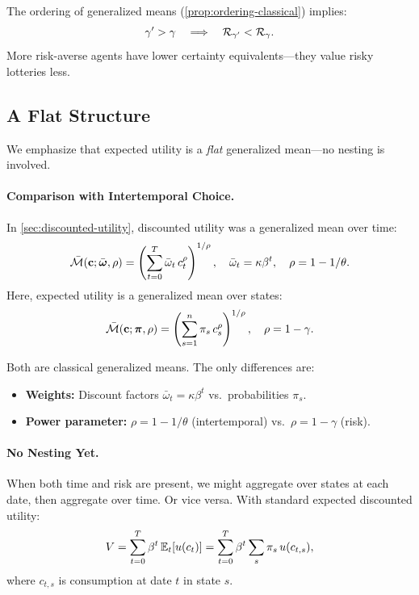The ordering of generalized means (\cref{prop:ordering-classical}) implies:
\begin{equation}
\gamma' > \gamma \quad \Longrightarrow \quad \mathcal{R}_{\gamma'} < \mathcal{R}_{\gamma}.
\label{eq:ce-ordering}
\end{equation}
More risk-averse agents have lower certainty equivalents---they value risky lotteries less.

\subsection{A Flat Structure}
\label{subsec:flat-structure}

We emphasize that expected utility is a \emph{flat} generalized mean---no nesting is involved.

\paragraph{Comparison with Intertemporal Choice.}
In \cref{sec:discounted-utility}, discounted utility was a generalized mean over time:
\begin{equation}
\bar{\mathcal{M}}(\mathbf{c}; \bar{\boldsymbol{\omega}}, \rho) = \left( \sum_{t=0}^{T} \bar{\omega}_t \, c_t^{\rho} \right)^{1/\rho}, \quad \bar{\omega}_t = \kappa \beta^t, \quad \rho = 1 - 1/\theta.
\label{eq:intertemporal-mean-recall}
\end{equation}
Here, expected utility is a generalized mean over states:
\begin{equation}
\bar{\mathcal{M}}(\mathbf{c}; \bm{\pi}, \rho) = \left( \sum_{s=1}^{n} \pi_s \, c_s^{\rho} \right)^{1/\rho}, \quad \rho = 1 - \gamma.
\label{eq:risk-mean-recall}
\end{equation}

Both are classical generalized means. The only differences are:
\begin{itemize}[leftmargin=2em]
    \item \textbf{Weights:} Discount factors $\bar{\omega}_t = \kappa\beta^t$ vs.\ probabilities $\pi_s$.
    \item \textbf{Power parameter:} $\rho = 1 - 1/\theta$ (intertemporal) vs.\ $\rho = 1 - \gamma$ (risk).
\end{itemize}

\paragraph{No Nesting Yet.}
When both time and risk are present, we might aggregate over states at each date, then aggregate over time. Or vice versa. With standard expected discounted utility:
\begin{equation}
V = \sum_{t=0}^{T} \beta^t \, \mathbb{E}_t[u(c_t)] = \sum_{t=0}^{T} \beta^t \sum_{s} \pi_s \, u(c_{t,s}),
\label{eq:expected-discounted}
\end{equation}
where $c_{t,s}$ is consumption at date $t$ in state $s$.


